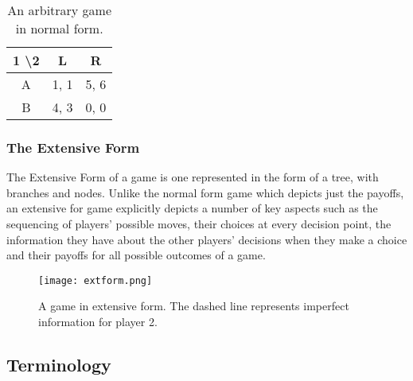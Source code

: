 \documentclass[11pt]{article}
\theoremstyle{definition}
\begin{document}
\begin{table}[h!]
\centering
\begin{tabular}{|c|c|c|}
\hline
1 \textbackslash 2 & L & R \\
\hline
A & 1, 1 & 5, 6 \\
\hline
B & 4, 3 & 0, 0 \\
\hline
\end{tabular}
\caption{An arbitrary game in normal form.}
\label{table:normal}
\end{table}


\subsubsection{The Extensive Form}
The Extensive Form of a game is one represented in the form of a tree, with branches and nodes. Unlike the normal form game which depicts just the payoffs, an extensive for game explicitly depicts a number of key aspects such as the sequencing of players’ possible moves, their choices at every decision point, the information they have about the other players’ decisions when they make a choice and their payoffs for all possible outcomes of a game.

\begin{figure}[h!]
\centering
\texttt{[image: extform.png]}
\caption{A game in extensive form. The dashed line represents imperfect information for player 2.}
\label{fig:extform}
\end{figure}

\newpage

\subsection{Terminology}
\end{document}
